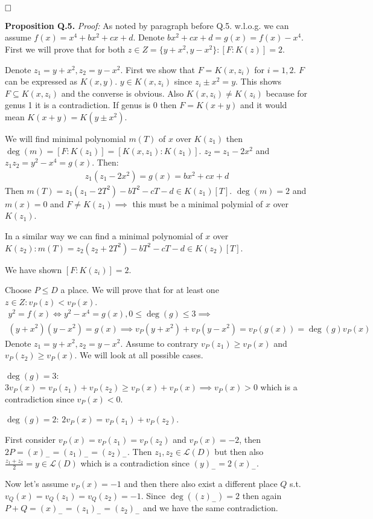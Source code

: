 \documentclass[12pt, a4paper]{article}
\newcommand{\qed}{\hfill\square}
\begin{document}
$\qed$

\textbf{Proposition Q.5.} \textit{Proof:}
As noted by paragraph before Q.5. w.l.o.g. we can assume $f(x) = x^4+bx^2+cx+d$. Denote $bx^2+cx+d = g(x)=f(x)-x^4$. First we will prove that for both $z \in Z = \{y+x^2, y-x^2\}: [F:K(z)]=2$. 

Denote $z_1=y+x^2, z_2=y-x^2$. First we show that $F=K(x,z_i)$ for $i=1,2$. $F$ can be expressed as $K(x,y)$. $y\in K(x,z_i)$ since $z_i \pm x^2 = y$. This shows $F \subseteq K(x,z_i)$ and the converse is obvious. Also $K(x,z_i) \neq K(z_i)$ because for genus 1 it is a contradiction. If genus is 0 then $F=K(x+y)$ and it would mean $K(x+y)=K(y \pm x^2)$. 

We will find minimal polynomial $m(T)$ of $x$ over $K(z_1)$ then $\deg(m) = [F:K(z_1)]=[K(x,z_1):K(z_1)]$. $z_2 = z_1 - 2x^2$ and $z_1z_2=y^2-x^4=g(x)$. Then:
\begin{gather*}
z_1(z_1-2x^2) = g(x) = bx^2+cx+d
\end{gather*}
Then $m(T)=z_1(z_1-2T^2)-bT^2-cT-d \in K(z_1)[T]$. $\deg(m)=2$ and $m(x)=0$ and $F\neq K(z_1) \implies$ this must be a minimal polymial of $x$ over $K(z_1)$.

In a similar way we can find a minimal polynomial of $x$ over $K(z_2): m(T) = z_2(z_2+2T^2)-bT^2-cT-d \in K(z_2)[T]$.

We have shown $[F:K(z_i)]=2$.


Choose $P \leq D$ a place. We will prove that for at least one $z \in Z: v_P(z) < v_P(x)$.
\begin{gather*}
y^2 = f(x) \iff y^2 - x^4 = g(x), 0 \leq \deg(g) \leq 3 \implies\\
(y+x^2)(y-x^2)=g(x) \implies v_P(y+x^2)+v_P(y-x^2) = v_P(g(x)) = \deg(g)v_P(x)
\end{gather*}
Denote $z_1 = y+x^2, z_2=y-x^2$. Assume to contrary $v_P(z_1) \geq v_P(x)$ and $v_P(z_2) \geq v_P(x)$. We will look at all possible cases.

$\deg(g)=3$: $3v_P(x)=v_P(z_1)+v_P(z_2) \geq v_P(x)+v_P(x) \implies v_P(x) > 0$ which is a contradiction since $v_P(x)<0$.

$\deg(g)=2$: $2v_P(x)=v_P(z_1)+v_P(z_2)$. 

First consider $v_P(x)=v_P(z_1)=v_P(z_2)$ and $v_P(x)=-2$, then $2P = (x)_{-}= (z_1)_{-} = (z_2)_{-}$. Then $z_1, z_2 \in \mathcal{L}(D)$ but then also $\frac{z_1+z_2}{2} = y \in \mathcal{L}(D)$ which is a contradiction since $(y)_{-}=2(x)_{-}$.

Now let's assume $v_P(x)=-1$ and then there also exist a different place $Q$ s.t. $v_Q(x)=v_Q(z_1)=v_Q(z_2)=-1$. Since $\deg((z)_{-})=2$ then again $P+Q = (x)_{-}= (z_1)_{-} = (z_2)_{-}$ and we have the same contradiction.
\end{document}
